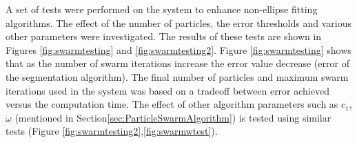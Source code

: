 \documentclass[preprint,10pt,5p,twocolumn]{elsarticle}
\begin{document}
\begin{table}
\begin{center}
\caption[Datasets Comparisons]{Table compares between datasets used in experiments in terms of number of samples, number of samples per category, etc...} 
\label{tab:datasets}

\end{center}
\end{table}

A set of tests were performed on the system to enhance non-ellipse fitting algorithms. The effect of the number of particles, the error thresholds and various other parameters were investigated. The results of these tests are shown in Figures \ref{fig:swarmtesting} and   \ref{fig:swarmtesting2}. Figure \ref{fig:swarmtesting} shows that as the number of swarm iterations increase the error value decrease (error of the segmentation algorithm). The final number of particles and maximum swarm iterations used in the system was based on a tradeoff between error achieved versus the computation time. The effect of other algorithm parameters such as $c_1$, $\omega$ (mentioned in Section\ref{sec:ParticleSwarmAlgorithm}) is tested using similar tests (Figure  \ref{fig:swarmtesting2},\ref{fig:swarmwtest}).%
    
\end{document}
